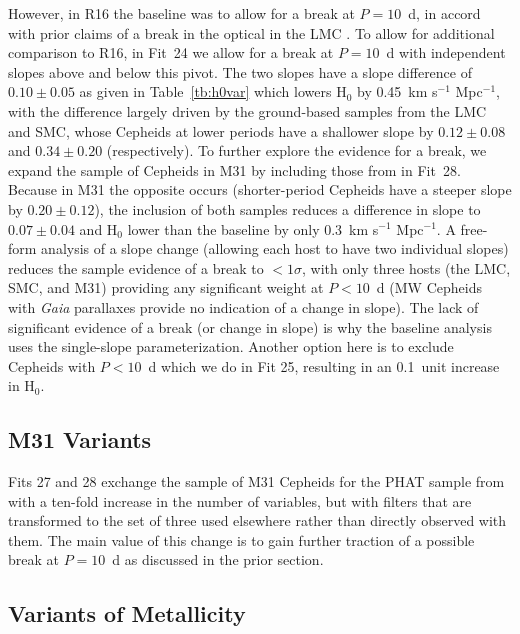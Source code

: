 \documentclass[12pt]{aastex631}
\newcommand{\kms}{km s$^{-1}$ Mpc$^{-1}$}
\begin{document}
However, in R16 the baseline was to allow for a break at $P=10$~d, in accord with prior claims of a break in the optical in the LMC \citep[][although no evidence for one was found by R16]{sandage04}. To allow for additional comparison to R16, in Fit~24 we allow for a break at $P\!=\!10$~d with independent slopes above and below this pivot.  The two slopes have a slope difference of $0.10\pm 0.05$ as given in Table~\ref{tb:h0var} which lowers H$_0$ by 0.45~\kms, with the difference largely driven by the ground-based samples from the LMC and SMC, whose Cepheids at lower periods have a shallower slope by $0.12 \pm 0.08$ and $0.34 \pm 0.20$ (respectively).   To further explore the evidence for a break, we expand the sample of Cepheids in M31 by including those from \citet[][sample III]{Kodric:2018} in Fit~28.  Because in M31 the opposite occurs (shorter-period Cepheids have a steeper slope by $0.20 \pm 0.12$), the inclusion of both samples reduces a difference in slope to $0.07\pm 0.04$ and H$_0$ lower than the baseline by only 0.3~\kms.  A free-form analysis of a slope change (allowing each host to have two individual slopes) reduces the sample evidence of a break to $< 1\sigma$, with only three hosts (the LMC, SMC, and M31) providing any significant weight at $P<10$~d (MW Cepheids with {\it Gaia} parallaxes provide no indication of a change in slope). The lack of significant evidence of a break (or change in slope) is why the baseline analysis uses the single-slope parameterization.  Another option here is to exclude Cepheids with $P<10$~d which we do in Fit 25, resulting in an 0.1~unit increase in H$_0$.

\subsection{M31 Variants\label{sc:6.5}}

Fits 27 and 28 exchange the \citet{Li:2021} sample of M31 Cepheids for the PHAT sample from \citet{Kodric:2018} with a ten-fold increase in the number of variables, but with filters that are transformed to the set of three used elsewhere rather than directly observed with them.  The main value of this change is to gain further traction of a possible break at $P\!=\!10$~d as discussed in the prior section.  

\clearpage

\subsection{Variants of Metallicity\label{sc:6.6}}  
\end{document}
